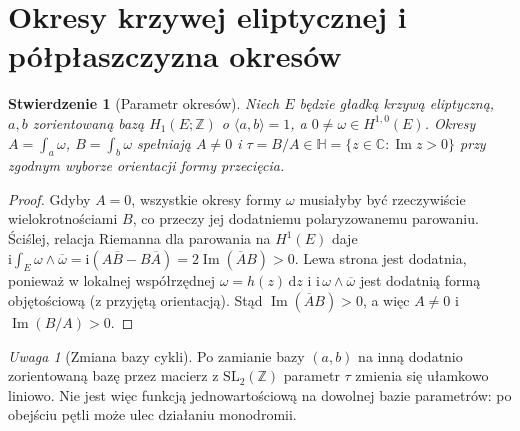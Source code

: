 \documentclass[11pt,a4paper,oneside]{report}
\newcommand{\C}{\mathbb{C}}
\newcommand{\Z}{\mathbb{Z}}
\newcommand{\dd}{\mathrm d}
\theoremstyle{plain}
\newtheorem{stwierdzenie}[twierdzenie]{Stwierdzenie}
\theoremstyle{definition}
\theoremstyle{remark}
\newtheorem{uwaga}[twierdzenie]{Uwaga}
\begin{document}
\section{Okresy krzywej eliptycznej i półpłaszczyzna okresów}
\begin{stwierdzenie}[Parametr okresów]
Niech $E$ będzie gładką krzywą eliptyczną, $a,b$ zorientowaną
bazą $H_1(E;\Z)$ o $\langle a,b\rangle=1$, a
$0\ne\omega\in H^{1,0}(E)$. Okresy
$A=\int_a\omega$, $B=\int_b\omega$ spełniają $A\ne0$ i
$\tau=B/A\in\mathbb H=\{z\in\C:\operatorname{Im}z>0\}$
przy zgodnym wyborze orientacji formy przecięcia.
\end{stwierdzenie}
\begin{proof}
Gdyby $A=0$, wszystkie okresy formy $\omega$ musiałyby
być rzeczywiście wielokrotnościami $B$, co przeczy
jej dodatniemu polaryzowanemu parowaniu.
Ściślej, relacja Riemanna dla parowania na $H^1(E)$ daje
$\mathrm i\int_E\omega\wedge\overline\omega
=\mathrm i(A\overline B-B\overline A)=2\operatorname{Im}(\overline A B)>0$.
Lewa strona jest dodatnia, ponieważ w lokalnej
współrzędnej $\omega=h(z)\,\dd z$ i
$\mathrm i\,\omega\wedge\overline\omega$
jest dodatnią formą objętościową (z przyjętą orientacją).
Stąd $\operatorname{Im}(\overline AB)>0$, a więc $A\ne0$
i $\operatorname{Im}(B/A)>0$.
\end{proof}
\begin{uwaga}[Zmiana bazy cykli]
Po zamianie bazy $(a,b)$ na inną dodatnio zorientowaną
bazę przez macierz z $\mathrm{SL}_2(\Z)$ parametr
$\tau$ zmienia się ułamkowo liniowo. Nie jest więc
funkcją jednowartościową na dowolnej bazie parametrów:
po obejściu pętli może ulec działaniu monodromii.
\end{uwaga}
\end{document}
